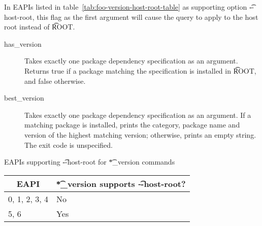  In EAPIs listed in table~\ref{tab:foo-version-host-root-table} as
supporting option \t{-{}-host-root}, this flag as the first argument will cause the query to apply
to the host root instead of \t{ROOT}.
\begin{description}
\item[has_version] Takes exactly one package dependency specification as an argument. Returns
    true if a package matching the specification is installed in \t{ROOT}, and false otherwise.
\item[best_version] Takes exactly one package dependency specification as an argument. If a
    matching package is installed, prints the category, package name and version of the highest
    matching version; otherwise, prints an empty string. The exit code is unspecified.
\end{description}

\begin{centertable}{EAPIs supporting \t{-{}-host-root} for \t{*_version} commands}
    \label{tab:foo-version-host-root-table}
    \begin{tabular}{ll}
      \toprule
      \multicolumn{1}{c}{\textbf{EAPI}} &
      \multicolumn{1}{c}{\textbf{\t{*_version} supports \t{-{}-host-root}?}} \\
      \midrule
      0, 1, 2, 3, 4     & No  \\
      5, 6              & Yes \\
      \bottomrule
    \end{tabular}
\end{centertable}

